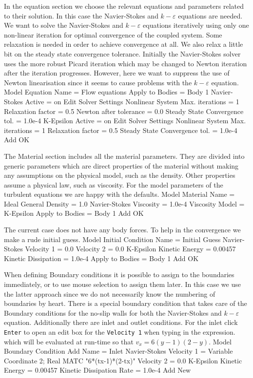 In the equation section we choose the relevant equations and 
parameters related to their solution. 
In this case the Navier-Stokes and $k-\varepsilon$ equations are needed.
We want to solve the Navier-Stokes and $k-\varepsilon$ equations iteratively using only one non-linear iteration
for optimal convergence of the coupled system. Some relaxation is needed in order to achieve convergence 
at all. We also relax a little bit on the steady state convergence tolerance. 
Initially the Navier-Stokes
solver uses the more robust Picard iteration which may be changed to Newton iteration after the iteration 
progresses. However, here we want to suppress the use of Newton linearisation since it seems to
cause problems with the $k-\varepsilon$ equation.
\ttbegin
Model
  Equation
    Name = Flow equations
    Apply to Bodies = Body 1
    Navier-Stokes 
      Active = on
      Edit Solver Settings
        Nonlinear System
          Max. iterations = 1
          Relaxation factor = 0.5
          Newton after tolerance = 0.0
        Steady State
          Convergence tol. = 1.0e-4
    K-Epsilon 
      Active = on
      Edit Solver Settings
        Nonlinear System
          Max. iterations = 1
          Relaxation factor = 0.5
        Steady State
          Convergence tol. = 1.0e-4
    Add 
    OK
\ttend        

The Material section includes all the material parameters.
They are divided into generic parameters which are direct properties of the material
without making any assumptions on the physical model, such as the density. Other properties assume
a physical law, such as viscosity. For the model parameters of the turbulent equations we are 
happy with the defaults. 
\ttbegin
Model
  Material
    Name = Ideal
    General 
      Density = 1.0
    Navier-Stokes 
      Viscosity = 1.0e-4
      Viscosity Model = K-Epsilon
    Apply to Bodies = Body 1 
    Add
    OK
\ttend

The current case does not have any body forces. To help in the convergence we make 
a rude initial guess.
\ttbegin
Model
  Initial Condition
    Name = Initial Guess
    Navier-Stokes
      Velocity 1 = 0.0
      Velocity 2 = 0.0
    K-Epsilon
      Kinetic Energy = 0.00457
      Kinetic Dissipation = 1.0e-4
    Apply to Bodies = Body 1 
    Add
    OK
\ttend

When defining Boundary conditions it is possible to assign to the boundaries immediately, or to use mouse
selection to assign them later. In this case we use the latter approach since we do not necessarily know 
the numbering of boundaries by heart.
There is a special boundary condition that takes care of the 
Boundary conditions for the no-slip walls for both the Navier-Stokes and
$k-\varepsilon$ equation. Additionally there are inlet and outlet conditions. 
For the inlet click \texttt{Enter} to open an edit box for the \texttt{Velocity 1} when typing in the expression.
which will be evaluated at run-time so that $v_x=6(y-1)(2-y)$. 
\ttbegin
Model
  Boundary Condition
    Add 
    Name = Inlet
    Navier-Stokes 
      Velocity 1 = Variable Coordinate 2; Real MATC "6*(tx-1)*(2-tx)"
      Velocity 2 = 0.0
    K-Epsilon
      Kinetic Energy = 0.00457
      Kinetic Dissipation Rate = 1.0e-4
    Add
    New

